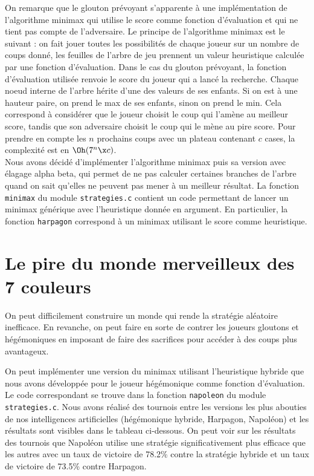 \documentclass[12pt,S,fira-sans]{paper}
\begin{document}
\begin{qu}
    On remarque que le glouton prévoyant s'apparente à une implémentation de l'algorithme minimax qui utilise le score comme fonction d'évaluation et qui ne tient pas compte de l'adversaire.
    Le principe de l'algorithme minimax est le suivant : on fait jouer toutes les possibilités de chaque joueur sur un nombre de coups donné, les feuilles de l'arbre de jeu prennent un valeur heuristique calculée par une fonction d'évaluation.
    Dans le cas du glouton prévoyant, la fonction d'évaluation utilisée renvoie le score du joueur qui a lancé la recherche.
    Chaque noeud interne de l'arbre hérite d'une des valeurs de ses enfants.
    Si on est à une hauteur paire, on prend le max de ses enfants, sinon on prend le min.
    Cela correspond à considérer que le joueur choisit le coup qui l'amène au meilleur score, tandis que son adversaire choisit le coup qui le mène au pire score.
    Pour prendre en compte les \(n\) prochains coups avec un plateau contenant \(c\) cases, la complexité est en \(\Oh(7^n \x c)\).\\
    Nous avons décidé d'implémenter l'algorithme minimax puis sa version avec élagage alpha beta, qui permet de ne pas calculer certaines branches de l'arbre quand on sait qu'elles ne peuvent pas mener à un meilleur résultat.
    La fonction \verb|minimax| du module \verb|strategies.c| contient un code permettant de lancer un minimax générique avec l'heuristique donnée en argument.
    En particulier, la fonction \verb|harpagon| correspond à un minimax utilisant le score comme heuristique.
\end{qu}

\section{Le pire du monde merveilleux des 7 couleurs}

\begin{qu}
    On peut difficilement construire un monde qui rende la stratégie aléatoire inefficace.
    En revanche, on peut faire en sorte de contrer les joueurs gloutons et hégémoniques en imposant de faire des sacrifices pour accéder à des coups plus avantageux.
\end{qu}

\begin{qu}
    On peut implémenter une version du minimax utilisant l'heuristique hybride que nous avons développée pour le joueur hégémonique comme fonction d'évaluation.
    Le code correspondant se trouve dans la fonction \verb|napoleon| du module \verb|strategies.c|. Nous avons réalisé des tournois entre les versions les plus abouties de nos intelligences artificielles (hégémonique hybride, Harpagon, Napoléon) et les résultats sont visibles dans le tableau ci-dessous.
    On peut voir sur les résultats des tournois que Napoléon utilise une stratégie significativement plus efficace que les autres avec un taux de victoire de 78.2\% contre la stratégie hybride et un taux de victoire de 73.5\% contre Harpagon.
\end{qu}
\end{document}
